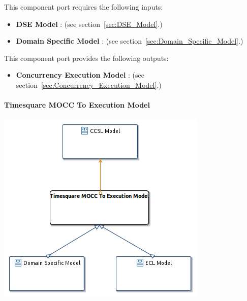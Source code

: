 \documentclass{gemoc} %
\begin{document}
This component port requires the following inputs:
\begin{itemize}
  \item \textbf{DSE Model} :
(see section~\ref{sec:DSE_Model}.)
  \item \textbf{Domain Specific Model} :
(see section~\ref{sec:Domain_Specific_Model}.)
\end{itemize}

This component port provides the following outputs:
\begin{itemize}
  \item \textbf{Concurrency Execution Model} :
(see section~\ref{sec:Concurrency_Execution_Model}.)
\end{itemize}

\paragraph{Timesquare MOCC To Execution Model}
\label{sec:Timesquare_MOCC_To_Execution_Model}


\begin{center}
\includegraphics*[trim=0.0cm 0.0cm 0cm 0.0cm, clip=true]{../images/generated/Generated_Timesquare_MOCC_To_Execution_Model.png}
\end{center}
\end{document}
